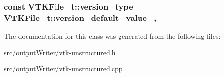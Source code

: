 \subsubsection[{\texorpdfstring{version\+\_\+default\+\_\+value\+\_\+}{version_default_value_}}]{\setlength{\rightskip}{0pt plus 5cm}const {\bf V\+T\+K\+File\+\_\+t\+::version\+\_\+type} V\+T\+K\+File\+\_\+t\+::version\+\_\+default\+\_\+value\+\_\+\hspace{0.3cm}{\ttfamily [static]}, {\ttfamily [protected]}}\hypertarget{classVTKFile__t_a014a015095591737663a8d8513aca931}{}\label{classVTKFile__t_a014a015095591737663a8d8513aca931}


The documentation for this class was generated from the following files\+:\begin{DoxyCompactItemize}
\item 
src/output\+Writer/\hyperlink{vtk-unstructured_8h}{vtk-\/unstructured.\+h}\item 
src/output\+Writer/\hyperlink{vtk-unstructured_8cpp}{vtk-\/unstructured.\+cpp}\end{DoxyCompactItemize}
